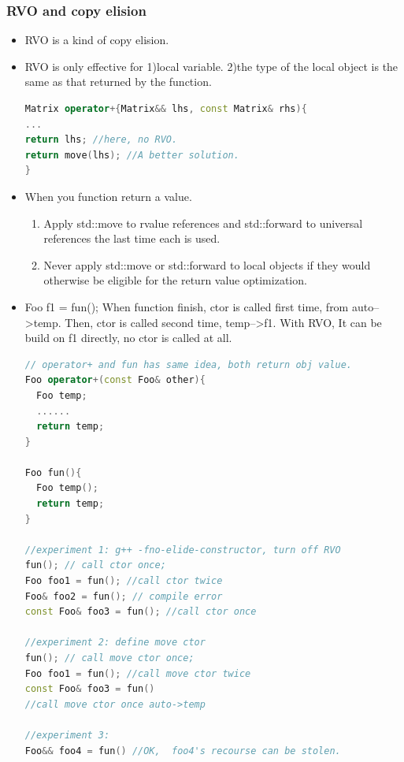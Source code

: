 \documentclass[a4paper,12pt,twoside]{book}
\begin{document}
\subsubsection{RVO and copy elision}
\begin{itemize}
\item RVO is a kind of copy elision.
		\item RVO is only effective for 1)local variable. 2)the type of the local object is the same as that returned by the function.

\begin{lstlisting}[frame=single, language=c++]
Matrix operator+{Matrix&& lhs, const Matrix& rhs){
...
return lhs; //here, no RVO.
return move(lhs); //A better solution.
}
\end{lstlisting}

\item When you function return a value.

\begin{enumerate}
\item Apply std::move to rvalue references and std::forward to universal references
the last time each is used.

\item Never apply std::move or std::forward to local objects if they would otherwise
be eligible for the return value optimization.
\end{enumerate}

\item Foo f1 = fun(); When function finish, ctor is called first time, from auto-->temp. Then, ctor is called  second time,  temp-->f1. With RVO, It can be build on f1 directly, no ctor is called at all.
\begin{lstlisting}[frame=single, language=c++]
// operator+ and fun has same idea, both return obj value.
Foo operator+(const Foo& other){
  Foo temp;
  ......
  return temp;
}

Foo fun(){
  Foo temp();
  return temp;
}

//experiment 1: g++ -fno-elide-constructor, turn off RVO
fun(); // call ctor once;
Foo foo1 = fun(); //call ctor twice
Foo& foo2 = fun(); // compile error
const Foo& foo3 = fun(); //call ctor once

//experiment 2: define move ctor
fun(); // call move ctor once;
Foo foo1 = fun(); //call move ctor twice
const Foo& foo3 = fun()
//call move ctor once auto->temp

//experiment 3:
Foo&& foo4 = fun() //OK,  foo4's recourse can be stolen.


\end{lstlisting}
\end{itemize}
\end{document}
